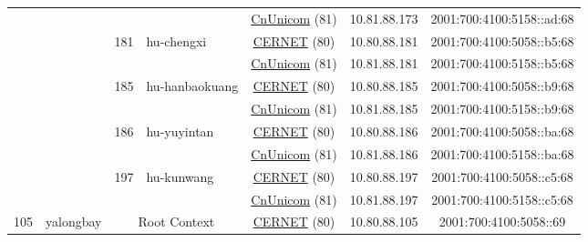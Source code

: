 \begin{small}
\begin{center}
\begin{longtable}{|c|c|c|c|c|c|c|c|}
  &  &  &  & \multicolumn{2}{|c|}{\tiny{\href{http://www.chinaunicom.com}{CnUnicom} (81)}} & \tiny{10.81.88.173} & \tiny{2001:700:4100:5158::ad:68} \\* \cline{3-3}\cline{4-4}\cline{5-5}\cline{6-6}\cline{7-7}\cline{8-8}
  &  & \multirow{2}{*}{\tiny{181}} & \multicolumn{1}{|l|}{\multirow{2}{*}{\tiny{hu-chengxi}}} & \multicolumn{2}{|c|}{\tiny{\href{http://www.cernet.edu.cn}{CERNET} (80)}} & \tiny{10.80.88.181} & \tiny{2001:700:4100:5058::b5:68} \\* \cline{5-5}\cline{6-6}\cline{7-7}\cline{8-8}
  &  &  &  & \multicolumn{2}{|c|}{\tiny{\href{http://www.chinaunicom.com}{CnUnicom} (81)}} & \tiny{10.81.88.181} & \tiny{2001:700:4100:5158::b5:68} \\* \cline{3-3}\cline{4-4}\cline{5-5}\cline{6-6}\cline{7-7}\cline{8-8}
  &  & \multirow{2}{*}{\tiny{185}} & \multicolumn{1}{|l|}{\multirow{2}{*}{\tiny{hu-hanbaokuang}}} & \multicolumn{2}{|c|}{\tiny{\href{http://www.cernet.edu.cn}{CERNET} (80)}} & \tiny{10.80.88.185} & \tiny{2001:700:4100:5058::b9:68} \\* \cline{5-5}\cline{6-6}\cline{7-7}\cline{8-8}
  &  &  &  & \multicolumn{2}{|c|}{\tiny{\href{http://www.chinaunicom.com}{CnUnicom} (81)}} & \tiny{10.81.88.185} & \tiny{2001:700:4100:5158::b9:68} \\* \cline{3-3}\cline{4-4}\cline{5-5}\cline{6-6}\cline{7-7}\cline{8-8}
  &  & \multirow{2}{*}{\tiny{186}} & \multicolumn{1}{|l|}{\multirow{2}{*}{\tiny{hu-yuyintan}}} & \multicolumn{2}{|c|}{\tiny{\href{http://www.cernet.edu.cn}{CERNET} (80)}} & \tiny{10.80.88.186} & \tiny{2001:700:4100:5058::ba:68} \\* \cline{5-5}\cline{6-6}\cline{7-7}\cline{8-8}
  &  &  &  & \multicolumn{2}{|c|}{\tiny{\href{http://www.chinaunicom.com}{CnUnicom} (81)}} & \tiny{10.81.88.186} & \tiny{2001:700:4100:5158::ba:68} \\* \cline{3-3}\cline{4-4}\cline{5-5}\cline{6-6}\cline{7-7}\cline{8-8}
  &  & \multirow{2}{*}{\tiny{197}} & \multicolumn{1}{|l|}{\multirow{2}{*}{\tiny{hu-kunwang}}} & \multicolumn{2}{|c|}{\tiny{\href{http://www.cernet.edu.cn}{CERNET} (80)}} & \tiny{10.80.88.197} & \tiny{2001:700:4100:5058::c5:68} \\* \cline{5-5}\cline{6-6}\cline{7-7}\cline{8-8}
  &  &  &  & \multicolumn{2}{|c|}{\tiny{\href{http://www.chinaunicom.com}{CnUnicom} (81)}} & \tiny{10.81.88.197} & \tiny{2001:700:4100:5158::c5:68} \\ \hline
 \multirow{24}{*}{\tiny{105}} & \multicolumn{1}{|l|}{\multirow{24}{*}{\tiny{yalongbay}}} & \multicolumn{2}{|c|}{\multirow{2}{*}{\tiny{Root Context}}} & \multicolumn{2}{|c|}{\tiny{\href{http://www.cernet.edu.cn}{CERNET} (80)}} & \tiny{10.80.88.105} & \tiny{2001:700:4100:5058::69} \\* \cline{5-5}\cline{6-6}\cline{7-7}\cline{8-8}

\end{longtable}
\end{center}
\end{small}
